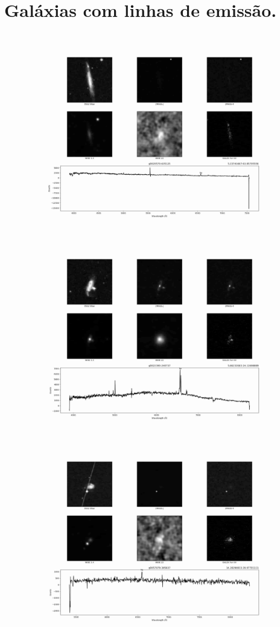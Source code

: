 \chapter{Galáxias com linhas de emissão.}
\begin{figure}[H]
    \begin{center}
        \includegraphics[scale = 0.10]{figuras/a1.jpg}
        \includegraphics[scale = 0.10]{figuras/a2.jpg}
        \includegraphics[scale = 0.10]{figuras/a3.jpg}

\end{center}
\end{figure}
